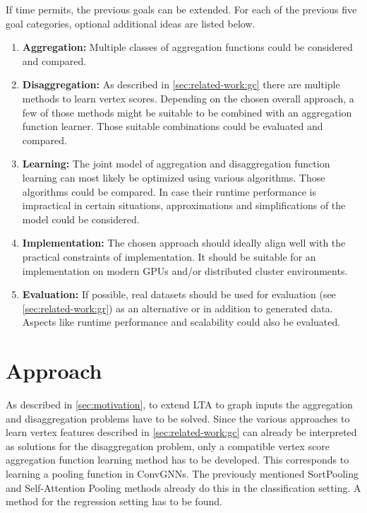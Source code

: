 \documentclass[12pt]{scrartcl}
\begin{document}
If time permits, the previous goals can be extended.
For each of the previous five goal categories, optional additional ideas are listed below.
\begin{enumerate}[label=\textbf{\arabic*.}]
	\item \textbf{Aggregation:}
		Multiple classes of aggregation functions could be considered and compared.
	\item \textbf{Disaggregation:}
		As described in \cref{sec:related-work:gc} there are multiple methods to learn vertex scores.
		Depending on the chosen overall approach, a few of those methods might be suitable to be combined with an aggregation function learner.
		Those suitable combinations could be evaluated and compared.
	\item \textbf{Learning:}
		The joint model of aggregation and disaggregation function learning can most likely be optimized using various algorithms.
		Those algorithms could be compared.
		In case their runtime performance is impractical in certain situations, approximations and simplifications of the model could be considered.
	\item \textbf{Implementation:}
		The chosen approach should ideally align well with the practical constraints of implementation.
		It should be suitable for an implementation on modern GPUs and/or distributed cluster environments.
	\item \textbf{Evaluation:}
		If possible, real datasets should be used for evaluation (see \cref{sec:related-work:gr}) as an alternative or in addition to generated data.
		Aspects like runtime performance and scalability could also be evaluated.
\end{enumerate}

\section{Approach}%
\label{sec:approach}

As described in \cref{sec:motivation}, to extend LTA to graph inputs the aggregation and disaggregation problems have to be solved.
Since the various approaches to learn vertex features described in \cref{sec:related-work:gc} can already be interpreted as solutions for the disaggregation problem, only a compatible vertex score aggregation function learning method has to be developed.
This corresponds to learning a pooling function in ConvGNNs.
The previously mentioned SortPooling and Self-Attention Pooling methods already do this in the classification setting.
A method for the regression setting has to be found.
\end{document}
